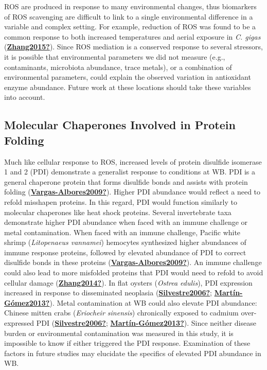 \documentclass [11pt, proquest] {uwthesis}[2015/03/03]
\begin{document}
ROS are produced in response to many environmental changes, thus biomarkers of ROS scavenging are difficult to link to a single environmental difference in a variable and complex setting. For example, reduction of ROS was found to be a common response to both increased temperatures and aerial exposure in \emph{C. gigas} (\protect\hyperlink{ref-Zhang2015}{\textbf{Zhang2015?}}). Since ROS mediation is a conserved response to several stressors, it is possible that environmental parameters we did not measure (e.g., contaminants, microbiota abundance, trace metals), or a combination of environmental parameters, could explain the observed variation in antioxidant enzyme abundance. Future work at these locations should take these variables into account.

\hypertarget{molecular-chaperones-involved-in-protein-folding}{%
\subsection{Molecular Chaperones Involved in Protein Folding}\label{molecular-chaperones-involved-in-protein-folding}}

Much like cellular response to ROS, increased levels of protein disulfide isomerase 1 and 2 (PDI) demonstrate a generalist response to conditions at WB. PDI is a general chaperone protein that forms disulfide bonds and assists with protein folding (\protect\hyperlink{ref-Vargas-Albores2009}{\textbf{Vargas-Albores2009?}}). Higher PDI abundance would reflect a need to refold misshapen proteins. In this regard, PDI would function similarly to molecular chaperones like heat shock proteins. Several invertebrate taxa demonstrate higher PDI abundance when faced with an immune challenge or metal contamination. When faced with an immune challenge, Pacific white shrimp (\emph{Litopenaeus vannamei}) hemocytes synthesized higher abundances of immune response proteins, followed by elevated abundance of PDI to correct disulfide bonds in these proteins (\protect\hyperlink{ref-Vargas-Albores2009}{\textbf{Vargas-Albores2009?}}). An immune challenge could also lead to more misfolded proteins that PDI would need to refold to avoid cellular damage (\protect\hyperlink{ref-Zhang2014}{\textbf{Zhang2014?}}). In flat oysters (\emph{Ostrea edulis}), PDI expression increased in response to disseminated neoplasia (\protect\hyperlink{ref-Silvestre2006}{\textbf{Silvestre2006?}}; \protect\hyperlink{ref-Martuxedn-Guxf3mez2013}{\textbf{Martín-Gómez2013?}}). Metal contamination at WB could also elevate PDI abundance: Chinese mitten crabs (\emph{Eriocheir sinensis}) chronically exposed to cadmium over-expressed PDI (\protect\hyperlink{ref-Silvestre2006}{\textbf{Silvestre2006?}}; \protect\hyperlink{ref-Martuxedn-Guxf3mez2013}{\textbf{Martín-Gómez2013?}}). Since neither disease burden or environmental contamination was measured in this study, it is impossible to know if either triggered the PDI response. Examination of these factors in future studies may elucidate the specifics of elevated PDI abundance in WB.
\end{document}
